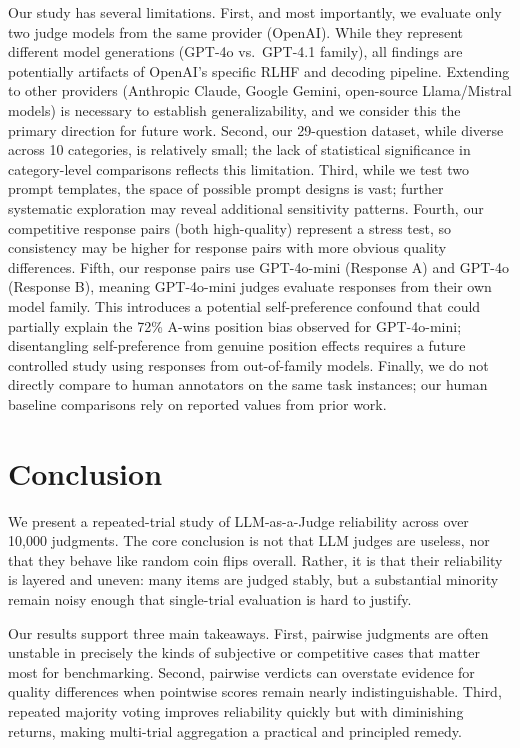 \documentclass{ijclclp}
\begin{document}
Our study has several limitations. First, and most importantly, we evaluate only two judge models from the same provider (OpenAI). While they represent different model generations (GPT-4o vs.\ GPT-4.1 family), all findings are potentially artifacts of OpenAI's specific RLHF and decoding pipeline. Extending to other providers (Anthropic Claude, Google Gemini, open-source Llama/Mistral models) is necessary to establish generalizability, and we consider this the primary direction for future work. Second, our 29-question dataset, while diverse across 10 categories, is relatively small; the lack of statistical significance in category-level comparisons reflects this limitation. Third, while we test two prompt templates, the space of possible prompt designs is vast; further systematic exploration may reveal additional sensitivity patterns. Fourth, our competitive response pairs (both high-quality) represent a stress test, so consistency may be higher for response pairs with more obvious quality differences. Fifth, our response pairs use GPT-4o-mini (Response A) and GPT-4o (Response B), meaning GPT-4o-mini judges evaluate responses from their own model family. This introduces a potential self-preference confound that could partially explain the 72\% A-wins position bias observed for GPT-4o-mini; disentangling self-preference from genuine position effects requires a future controlled study using responses from out-of-family models. Finally, we do not directly compare to human annotators on the same task instances; our human baseline comparisons rely on reported values from prior work.

\section{Conclusion}

We present a repeated-trial study of LLM-as-a-Judge reliability across over 10,000 judgments. The core conclusion is not that LLM judges are useless, nor that they behave like random coin flips overall. Rather, it is that their reliability is layered and uneven: many items are judged stably, but a substantial minority remain noisy enough that single-trial evaluation is hard to justify.

Our results support three main takeaways. First, pairwise judgments are often unstable in precisely the kinds of subjective or competitive cases that matter most for benchmarking. Second, pairwise verdicts can overstate evidence for quality differences when pointwise scores remain nearly indistinguishable. Third, repeated majority voting improves reliability quickly but with diminishing returns, making multi-trial aggregation a practical and principled remedy.
\end{document}

